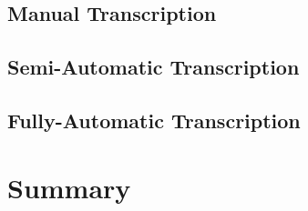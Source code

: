 \subsection{Manual Transcription}\label{subsec:manual-transcription}

\subsection{Semi-Automatic Transcription}\label{subsec:semi-auto-transcription}

\subsection{Fully-Automatic Transcription}\label{subsec:full-auto-transcription}

\section{Summary}\label{sec:lit-survey-summary}

